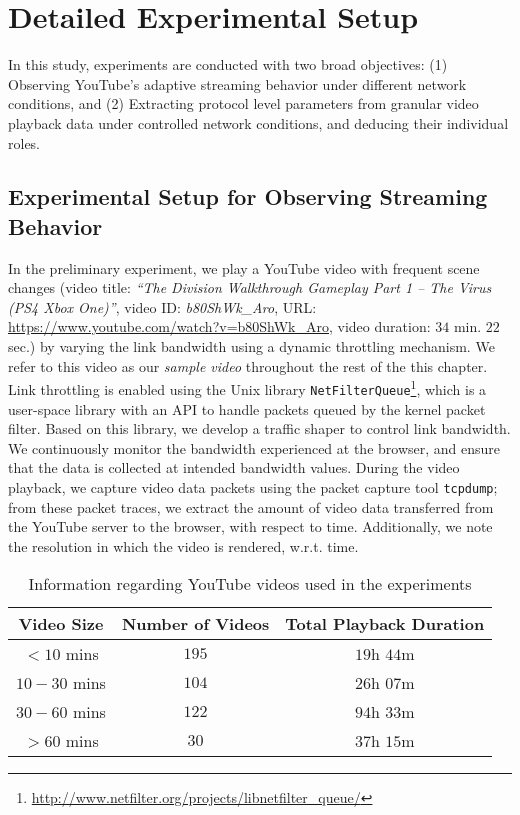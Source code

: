 \section{Detailed Experimental Setup}
\label{chap03s1:sec:experiments}

In this study, experiments are conducted with two broad objectives: (1) Observing YouTube's adaptive streaming behavior under different network conditions, and (2) Extracting protocol level parameters from granular video playback data under controlled network conditions, and deducing their individual roles.

\subsection{Experimental Setup for Observing Streaming Behavior} In the preliminary experiment, we play a YouTube video with frequent scene changes (video title: {\em ``The Division Walkthrough Gameplay Part 1 -- The Virus (PS4 Xbox One)''}, video ID: {\em b80ShWk\_Aro}, URL: \url{https://www.youtube.com/watch?v=b80ShWk_Aro}, video duration: $34$ min. $22$ sec.) by varying the link bandwidth using a dynamic throttling mechanism.
We refer to this video as our {\it sample video} throughout the rest of the this chapter.
Link throttling is enabled using the Unix library \texttt{NetFilterQueue}\footnote{\url{http://www.netfilter.org/projects/libnetfilter_queue/}}, which is a user-space library with an API to handle packets queued by the kernel packet filter.
Based on this library, we develop a traffic shaper to control link bandwidth.
We continuously monitor the bandwidth experienced at the browser, and ensure that the data is collected at intended bandwidth values.
During the video playback, we capture video data packets using the packet capture tool \texttt{tcpdump}; from these packet traces, we extract the amount of video data transferred from the YouTube server to the browser, with respect to time.
Additionally, we note the resolution in which the video is rendered, w.r.t. time.

\begin{table}[!t]
 \small
 \centering
 \caption{\small{Information regarding YouTube videos used in the experiments}}
 \label{table:chap03s1:statvid}
 \begin{tabular}{|c|c|c|}
  \hline 
  \textbf{Video Size} & \textbf{Number of Videos} & \textbf{Total Playback Duration} \\
  \hline \hline 
  $<10$ mins & $195$ & $19$h $44$m \\
  \hline 
  $10-30$ mins & $104$ & $26$h $07$m \\
  \hline 
  $30-60$ mins & $122$ & $94$h $33$m \\
  \hline 
  $>60$ mins & $30$ & $37$h $15$m \\
  \hline 
 \end{tabular}
\end{table}

